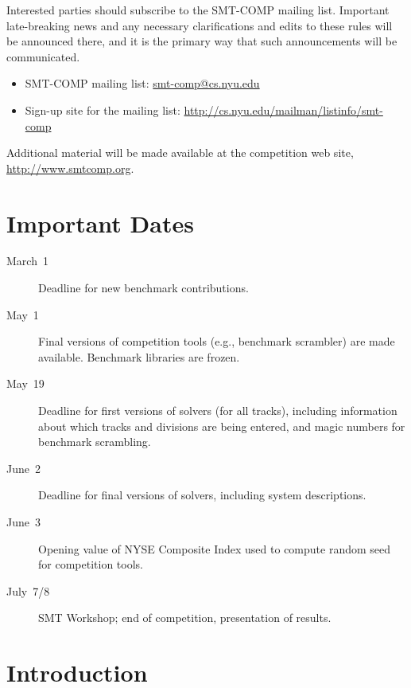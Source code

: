 \documentclass[12pt]{article}
\begin{document}
Interested parties should subscribe to the SMT-COMP mailing list.
Important late-breaking news and any necessary clarifications and
edits to these rules will be announced there, and it is the primary
way that such announcements will be communicated.

\begin{itemize}
\item SMT-COMP mailing list:
  \href{mailto:smt-comp@cs.nyu.edu}{\textrm{smt-comp@cs.nyu.edu}}
\item Sign-up site for the mailing list:
  \url{http://cs.nyu.edu/mailman/listinfo/smt-comp}
\end{itemize}

\noindent Additional material will be made available at the
competition web site, \url{http://www.smtcomp.org}.


\newpage

\section{Important Dates}
\label{sec:important}

\begin{description}
\item[March~1] Deadline for new benchmark contributions.
\item[May~1] Final versions of competition tools (e.g., benchmark
  scrambler) are made available.  Benchmark libraries are frozen.
\item[May~19] Deadline for first versions of solvers (for all tracks),
  including information about which tracks and divisions are being
  entered, and magic numbers for benchmark scrambling.
\item[June~2] Deadline for final versions of solvers, including
  system descriptions.
\item[June~3] Opening value of NYSE Composite Index used to compute
  random seed for competition tools.
\item[July~7/8] SMT Workshop; end of competition, presentation of
  results.
\end{description}


\section{Introduction}
\end{document}
